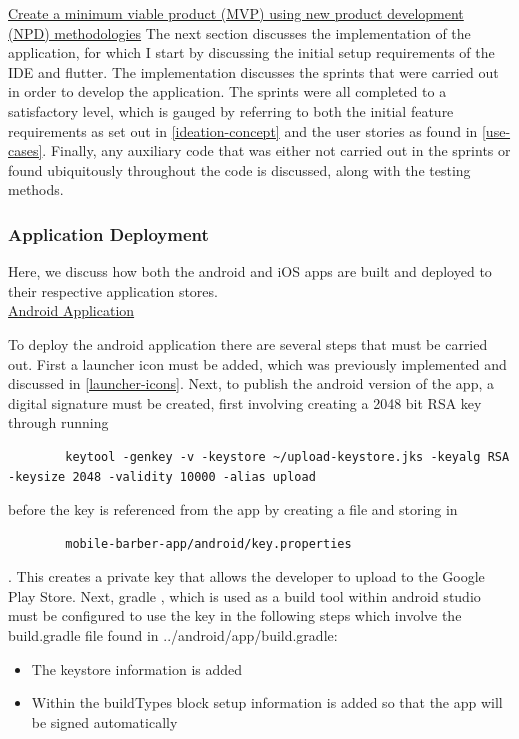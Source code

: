 \documentclass[12pt]{article}
\begin{document}
	\noindent
	\underline{Create a minimum viable product (MVP) using new product development}
	\\
	\underline{(NPD) methodologies} 
	\newline
	The next section discusses the implementation of the application, for which I start by discussing the initial setup requirements of the IDE and flutter. The implementation discusses the sprints that were carried out in order to develop the application. The sprints were all completed to a satisfactory level, which is gauged by referring to both the initial feature requirements as set out in \autoref{ideation-concept} and the user stories as found in \autoref{use-cases}. Finally, any auxiliary code that was either not carried out in the sprints or found ubiquitously throughout the code is discussed, along with the testing methods.
	
	\subsubsection{Application Deployment}
	Here, we discuss how both the android and iOS apps are built and deployed to their respective application stores.
	\\
	
	\noindent
	\underline{Android Application}
	
	\noindent
	To deploy the android application there are several steps that must be carried out. First a launcher icon must be added, which was previously implemented and discussed in \autoref{launcher-icons}. Next, to publish the android version of the app, a digital signature must be created, first involving creating a 2048 bit RSA key through running 
	\begin{lstlisting}
		keytool -genkey -v -keystore ~/upload-keystore.jks -keyalg RSA -keysize 2048 -validity 10000 -alias upload
	\end{lstlisting}
	before the key is referenced from the app by creating a file and storing in 
	\begin{lstlisting}
		mobile-barber-app/android/key.properties
	\end{lstlisting}.
	This creates a private key that allows the developer to upload to the Google Play Store.
	Next, gradle \cite{androidAndroidGradlePlugin2021}, which is used as a build tool within android studio must be configured to use the key in the following steps which involve the build.gradle file found in ../android/app/build.gradle: 
	\begin{itemize}
		\item The keystore information is added
		\item Within the buildTypes block setup information is added so that the app will be signed automatically
	\end{itemize}
	
\end{document}
